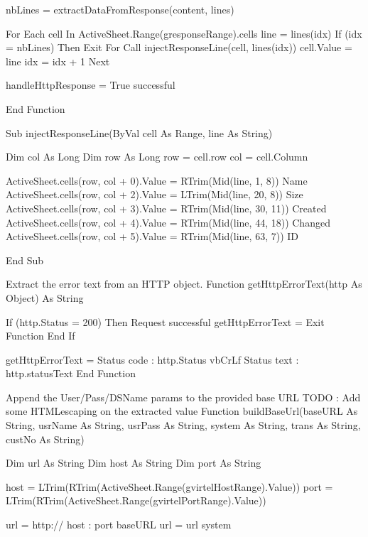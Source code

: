 \documentclass[letterpaper,10pt,english]{sphinxmanual}
\begin{document}
\begin{sphinxVerbatim}[commandchars=\\\{\}]
   nbLines = extractDataFromResponse(content, lines)

   For Each cell In ActiveSheet.Range(g\PYGZus{}responseRange).cells
\PYGZsq{}        line = lines(idx)
      If (idx = nbLines) Then Exit For
      Call injectResponseLine(cell, lines(idx))
\PYGZsq{}        cell.Value = line
      idx = idx + 1
   Next

   handleHttpResponse = True   \PYGZsq{} successful

End Function

Sub injectResponseLine(ByVal cell As Range, line As String)

   Dim col As Long
   Dim row As Long
   row = cell.row
   col = cell.Column

   ActiveSheet.cells(row, col + 0).Value = RTrim(Mid(line, 1, 8))               \PYGZsq{} Name
   ActiveSheet.cells(row, col + 2).Value = LTrim(Mid(line, 20, 8))              \PYGZsq{} Size
   ActiveSheet.cells(row, col + 3).Value = RTrim(Mid(line, 30, 11))             \PYGZsq{} Created
   ActiveSheet.cells(row, col + 4).Value = RTrim(Mid(line, 44, 18))             \PYGZsq{} Changed
   ActiveSheet.cells(row, col + 5).Value = RTrim(Mid(line, 63, 7))              \PYGZsq{} ID

End Sub


\PYGZsq{} Extract the error text from an HTTP object.
\PYGZsq{}
Function getHttpErrorText(http As Object) As String

   If (http.Status = 200) Then \PYGZsq{} Request successful
      getHttpErrorText = \PYGZdq{}\PYGZdq{}
      Exit Function
   End If

   getHttpErrorText = \PYGZdq{}Status code : \PYGZdq{} \PYGZam{} http.Status \PYGZam{} vbCrLf \PYGZus{}
                     \PYGZam{} \PYGZdq{}Status text : \PYGZdq{} \PYGZam{} http.statusText
End Function


\PYGZsq{} Append the User/Pass/DSName params to the provided base URL
\PYGZsq{}
\PYGZsq{} TODO : Add some HTML\PYGZhy{}escaping on the extracted value
\PYGZsq{}
Function buildBaseUrl(baseURL As String, usrName As String, usrPass As String, system As String, trans As String, custNo As String)

   Dim url As String
   Dim host As String
   Dim port As String

   \PYGZsq{}\PYGZhy{}\PYGZhy{} host = LTrim(RTrim(ActiveSheet.Range(g\PYGZus{}virtelHostRange).Value))
   \PYGZsq{}\PYGZhy{}\PYGZhy{} port = LTrim(RTrim(ActiveSheet.Range(g\PYGZus{}virtelPortRange).Value))

   url = \PYGZdq{}http://\PYGZdq{} \PYGZam{} host \PYGZam{} \PYGZdq{}:\PYGZdq{} \PYGZam{} port \PYGZam{} baseURL
   url = url \PYGZam{} system


\end{sphinxVerbatim}
\end{document}
